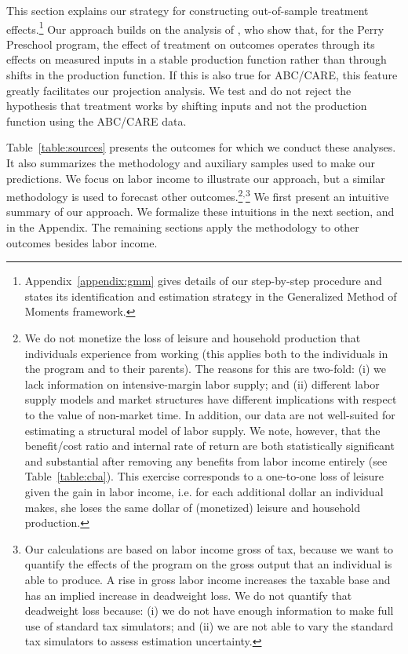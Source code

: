 This section explains our strategy for constructing out-of-sample treatment effects.\footnote{ Appendix~\ref{appendix:gmm} gives details of our step-by-step procedure and states its identification and estimation strategy in the Generalized Method of Moments framework.} Our approach builds on the analysis of \citet{Heckman_Pinto_etal_2013_PerryFactor}, who show that, for the Perry Preschool program, the effect of treatment on outcomes operates through its effects on measured inputs in a stable production function rather than through shifts in the production function. If this is also true for ABC/CARE, this feature greatly facilitates our projection analysis. We test and do not reject the hypothesis that treatment works by shifting inputs and not the production function using the ABC/CARE data.

Table~\ref{table:sources} presents the outcomes for which we conduct these analyses. It also summarizes the methodology and auxiliary samples used to make our predictions. We focus on labor income to illustrate our approach, but a similar methodology is used to forecast other outcomes.\footnote{We do not monetize the loss of leisure and household production that individuals experience from working (this applies both to the individuals in the program and to their parents). The reasons for this are two-fold: (i) we lack information on intensive-margin labor supply; and (ii) different labor supply models and market structures have different implications with respect to the value of non-market time. In addition, our data are not well-suited for estimating a structural model of labor supply. We note, however, that the benefit/cost ratio and internal rate of return are both statistically significant and substantial after removing any benefits from labor income entirely (see Table~\ref{table:cba}). This exercise corresponds to a one-to-one loss of leisure given the gain in labor income, i.e. for each additional dollar an individual makes, she loses the same dollar of (monetized) leisure and household production.}$^,$\footnote{Our calculations are based on labor income gross of tax, because we want to quantify the effects of the program on the gross output that an individual is able to produce. A rise in gross labor income increases the taxable base and has an implied increase in deadweight loss. We do not quantify that deadweight loss because: (i) we do not have enough information to make full use of standard tax simulators; and (ii) we are not able to vary the standard tax simulators to assess estimation uncertainty.} We first present an intuitive summary of our approach. We formalize these intuitions in the next section, and in the Appendix. The remaining sections apply the methodology to other outcomes besides labor income.

